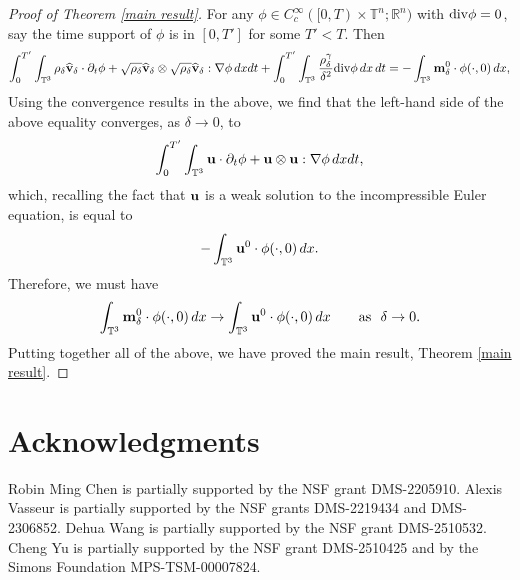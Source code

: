 \documentclass[12pt,reqno]{amsart}
\theoremstyle{definition}
\theoremstyle{remark}
\numberwithin{equation}{section}
\renewcommand{\u}{{\bf u}}
\newcommand{\R}{{\mathbb R}}
\newcommand{\Dv}{{\rm div}}
\renewcommand{\v}{{\bf v}}
\newcommand{\m}{{\bf m}}
\begin{document}
\begin{proof}[Proof of Theorem \ref{main result}]
For any $\phi \in C^\infty_c([0, T) \times \mathbb{T}^n; \R^n)$ with $\Dv\phi=0$, say the time support of $\phi$ is in $[0, T']$ for some $T' < T$. Then
\begin{equation*}
\begin{split}
\int^{T'}_0 \int_{\mathbb{T}^3} \rho_{\delta}\widehat{\v}_{\delta} \cdot \partial_t \phi + \sqrt{\rho_{\delta}}\widehat{\v}_{\delta} \otimes\sqrt{\rho_{\delta}}\widehat{\v}_{\delta} : \nabla \phi  \,dxdt +\int_0^{T'} \int_{\mathbb{T}^3}\frac{\rho_{\delta}^{\gamma}}{\delta^2}\Dv \phi\,dx\,dt
=  -\int_{\mathbb{T}^3} \m_{\delta}^0 \cdot \phi(\cdot, 0) \,dx,
\end{split}
\end{equation*}
Using the convergence results in the above, we find that the left-hand side of the above equality converges, as $\delta \to 0$, to
$$
\int^{T'}_0 \int_{\mathbb{T}^3} \u \cdot \partial_t \phi + \u \otimes \u : \nabla \phi  \,dxdt, 
$$
which, recalling the fact that $\u$ is a weak solution to the incompressible Euler equation, is equal to
\[
-\int_{\mathbb{T}^3} \u^0 \cdot \phi(\cdot, 0) \,dx.
\]
Therefore, we must have 
$$
\int_{\mathbb{T}^3} \m_{\delta}^0 \cdot \phi(\cdot, 0) \,dx\to \int_{\mathbb{T}^3} \u^0 \cdot \phi(\cdot, 0) \,dx \qquad \text{as }\ \delta \to 0.
$$
Putting together all of the above, we have proved the main result, Theorem \ref{main result}.
\end{proof}


\bigskip

\section*{Acknowledgments}
Robin Ming Chen is partially supported by the NSF grant DMS-2205910. 
Alexis Vasseur is partially supported by the NSF grants DMS-2219434 and DMS-2306852. 
Dehua Wang is partially supported by the NSF grant DMS-2510532. 
Cheng Yu is partially supported by the NSF grant DMS-2510425 and by the Simons Foundation MPS-TSM-00007824.
\end{document}
